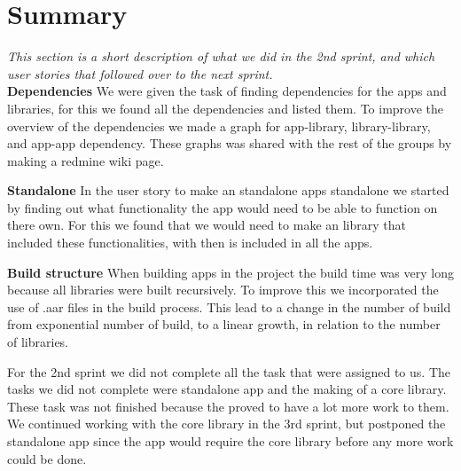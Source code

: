 \section{Summary} 
\textit{This section is a short description of what we did in the 2nd sprint, and which user stories that followed over to the next sprint.}\\

\textbf{Dependencies}
We were given the task of finding dependencies for the apps and libraries, for this we found all the dependencies and listed them. To improve the overview of the dependencies we made a graph for app-library, library-library, and app-app dependency. These graphs was shared with the rest of the groups by making a redmine wiki page.

\textbf{Standalone}
In the user story to make an standalone apps standalone we started by finding out what functionality the app would need to be able to function on there own. For this we found that we would need to make an library that included these functionalities, with then is included in all the apps.

\textbf{Build structure}
When building apps in the project the build time was very long because all libraries were built recursively. To improve this we incorporated the use of .aar files in the build process. This lead to a change in the number of build from exponential number of build, to a linear growth, in relation to the number of libraries.

For the 2nd sprint we did not complete all the task that were assigned to us. The tasks we did not complete were standalone app and the making of a core library. These task was not finished because the proved to have a lot more work to them. We continued working with the core library in the 3rd sprint, but postponed the standalone app since the app would require the core library before any more work could be done.